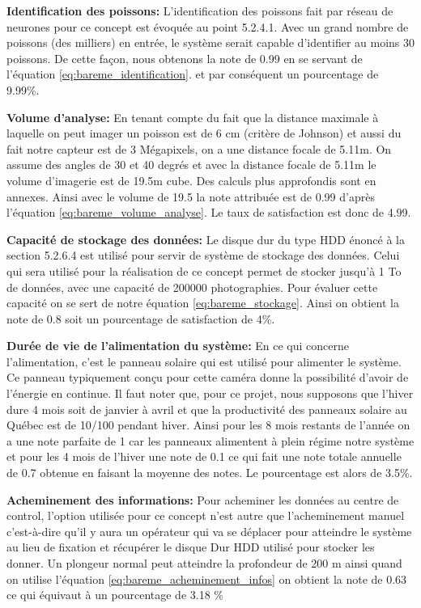 \textbf{Identification des poissons:} L’identification des poissons fait par réseau de neurones pour ce concept est évoquée au point 5.2.4.1. Avec un grand nombre de poissons (des milliers) en entrée, le système serait capable d’identifier au moins 30 poissons. De cette façon, nous obtenons la note de 0.99 en se servant de l’équation \ref{eq:bareme_identification}. et par conséquent un pourcentage de 9.99\%.
\vspace{5mm}


\textbf{Volume d’analyse:} En tenant compte du fait que la distance maximale à laquelle on peut imager un poisson est de 6 cm (critère de Johnson) et aussi du fait notre capteur est de 3 Mégapixels, on a une distance focale de 5.11m. On assume des angles de 30 et 40 degrés et avec la distance focale de 5.11m le volume d’imagerie est de 19.5m cube. Des calculs plus approfondis sont en annexes. Ainsi avec le volume de 19.5 la note attribuée est de 0.99 d’après l’équation \ref{eq:bareme_volume_analyse}. Le taux de satisfaction est donc de 4.99.
\vspace{5mm}


\textbf{Capacité de stockage des données:} Le disque dur du type HDD énoncé à la section 5.2.6.4 est utilisé pour servir de système de stockage des données. Celui qui sera utilisé pour la réalisation de ce concept permet de stocker jusqu’à 1 To de données, avec une capacité de 200000 photographies. Pour évaluer cette capacité on se sert de notre équation \ref{eq:bareme_stockage}. Ainsi on obtient la note de 0.8 soit un pourcentage de satisfaction de 4\%.
\vspace{5mm}

  
\textbf{Durée de vie de l’alimentation du système:} En ce qui concerne l’alimentation, c’est le panneau solaire qui est utilisé pour alimenter le système. Ce panneau typiquement conçu pour cette caméra donne la possibilité d’avoir de l’énergie en continue. Il faut noter que, pour ce projet, nous supposons que l’hiver dure 4 mois soit de janvier à avril et que la productivité des panneaux solaire au Québec est de 10/100 pendant hiver. Ainsi pour les 8 mois restants de l’année on a une note parfaite de 1 car les panneaux alimentent à plein régime notre système et pour les 4 mois de l’hiver une note de 0.1  ce qui fait une note totale annuelle de 0.7 obtenue en faisant la moyenne des notes. Le pourcentage est alors de 3.5\%.
\vspace{5mm}
 
 
\textbf{Acheminement des informations:} Pour acheminer les données au centre de control, l’option utilisée pour ce concept n’est autre que l’acheminement manuel c’est-à-dire qu’il y aura un opérateur qui va se déplacer pour atteindre le système au lieu de fixation et récupérer le disque Dur HDD utilisé pour stocker les donner. Un plongeur normal peut atteindre la profondeur de 200 m ainsi quand on utilise l’équation \ref{eq:bareme_acheminement_infos} on obtient la note de 0.63 ce qui équivaut à un pourcentage de 3.18 \%
\vspace{5mm}


